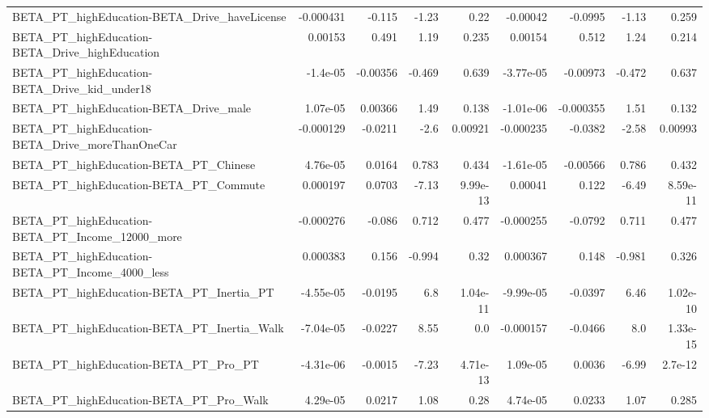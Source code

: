 \begin{tabular}{lrrrrrrrr}
BETA\_PT\_highEducation-BETA\_Drive\_haveLicense       &   -0.000431 &       -0.115 &    -1.23 &     0.22 &   -0.00042 &     -0.0995 &        -1.13 &         0.259 \\
BETA\_PT\_highEducation-BETA\_Drive\_highEducation     &     0.00153 &        0.491 &     1.19 &    0.235 &    0.00154 &       0.512 &         1.24 &         0.214 \\
BETA\_PT\_highEducation-BETA\_Drive\_kid\_under18       &    -1.4e-05 &     -0.00356 &   -0.469 &    0.639 &  -3.77e-05 &    -0.00973 &       -0.472 &         0.637 \\
BETA\_PT\_highEducation-BETA\_Drive\_male              &    1.07e-05 &      0.00366 &     1.49 &    0.138 &  -1.01e-06 &   -0.000355 &         1.51 &         0.132 \\
BETA\_PT\_highEducation-BETA\_Drive\_moreThanOneCar    &   -0.000129 &      -0.0211 &     -2.6 &  0.00921 &  -0.000235 &     -0.0382 &        -2.58 &       0.00993 \\
BETA\_PT\_highEducation-BETA\_PT\_Chinese              &    4.76e-05 &       0.0164 &    0.783 &    0.434 &  -1.61e-05 &    -0.00566 &        0.786 &         0.432 \\
BETA\_PT\_highEducation-BETA\_PT\_Commute              &    0.000197 &       0.0703 &    -7.13 & 9.99e-13 &    0.00041 &       0.122 &        -6.49 &      8.59e-11 \\
BETA\_PT\_highEducation-BETA\_PT\_Income\_12000\_more    &   -0.000276 &       -0.086 &    0.712 &    0.477 &  -0.000255 &     -0.0792 &        0.711 &         0.477 \\
BETA\_PT\_highEducation-BETA\_PT\_Income\_4000\_less     &    0.000383 &        0.156 &   -0.994 &     0.32 &   0.000367 &       0.148 &       -0.981 &         0.326 \\
BETA\_PT\_highEducation-BETA\_PT\_Inertia\_PT           &   -4.55e-05 &      -0.0195 &      6.8 & 1.04e-11 &  -9.99e-05 &     -0.0397 &         6.46 &      1.02e-10 \\
BETA\_PT\_highEducation-BETA\_PT\_Inertia\_Walk         &   -7.04e-05 &      -0.0227 &     8.55 &      0.0 &  -0.000157 &     -0.0466 &          8.0 &      1.33e-15 \\
BETA\_PT\_highEducation-BETA\_PT\_Pro\_PT               &   -4.31e-06 &      -0.0015 &    -7.23 & 4.71e-13 &   1.09e-05 &      0.0036 &        -6.99 &       2.7e-12 \\
BETA\_PT\_highEducation-BETA\_PT\_Pro\_Walk             &    4.29e-05 &       0.0217 &     1.08 &     0.28 &   4.74e-05 &      0.0233 &         1.07 &         0.285 \\

\end{tabular}
